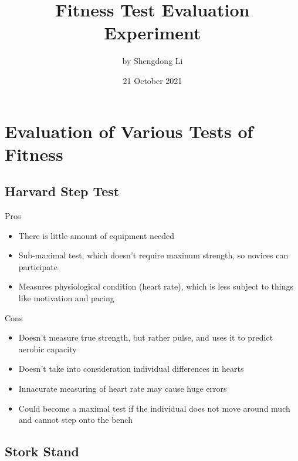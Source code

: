 \documentclass[12pt]{article}
\begin{document}
\title{Fitness Test Evaluation Experiment}
\author{by Shengdong Li}
\date{21 October 2021}
\maketitle

\section*{Evaluation of Various Tests of Fitness}

\subsection*{Harvard Step Test}

\begin{minipage}[t]{0.5\textwidth}
\begin{center}Pros\end{center}
    \begin{itemize}
        \item There is little amount of equipment needed
        \item Sub-maximal test, which doesn't require maxinum strength, so novices can participate
        \item Measures physiological condition (heart rate), which is less subject to things like motivation and pacing
    \end{itemize}
\end{minipage}
\begin{minipage}[t]{0.5\textwidth}
\begin{center}Cons\end{center}
    \begin{itemize}
\item Doesn't measure true strength, but rather pulse, and uses it to predict aerobic capacity
        \item Doesn't take into consideration individual differences in hearts
        \item Innacurate measuring of heart rate may cause huge errors
\item Could become a maximal test if the individual does not move around much and cannot step onto the bench
\end{itemize}
\end{minipage}

\subsection*{Stork Stand}
\end{document}
